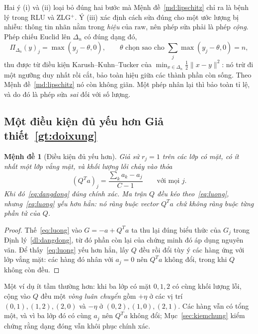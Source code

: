 \documentclass[11pt]{article}
\newtheorem{menhde}[dinhly]{Mệnh đề}
\theoremstyle{remark}
\newcommand{\simplex}{\Delta_n}
\begin{document}
Hai ý (i) và (ii) loại bỏ đúng hai bước mà Mệnh đề~\ref{md:lipschitz} chỉ ra
là bệnh lý trong RLU và ZLG$^+$. Ý (iii) xác định cách sửa đúng cho một ước
lượng bị nhiễu: thông tin nhãn nằm trong \emph{hiệu} của $\mathrm{raw}$, nên
phép sửa phải là phép \emph{cộng}. Phép chiếu Euclid lên $\simplex$ có đúng
dạng đó,
\[
 \Pi_{\simplex}(y)_j = \max(y_j - \theta, 0),
 \qquad \theta \text{ chọn sao cho } \textstyle\sum_j \max(y_j-\theta,0) = n,
\]
thu được từ điều kiện Karush--Kuhn--Tucker của
$\min_{x\in\simplex}\tfrac12\|x-y\|^2$: nó trừ đi một ngưỡng duy nhất rồi
cắt, bảo toàn hiệu giữa các thành phần còn sống. Theo
Mệnh đề~\ref{md:lipschitz} nó còn không giãn. Một phép nhân lại thì bảo toàn
tỉ lệ, và do đó là phép sửa \emph{sai} đối với số lượng.

\subsection{Một điều kiện đủ yếu hơn Giả thiết~\ref{gt:doixung}}

\begin{menhde}[Điều kiện đủ yếu hơn]
\label{md:dieukienyeu}
Giả sử $r_j = 1$ trên các lớp có mặt, có ít nhất một lớp vắng mặt, và khối
lượng lỗi chảy vào thỏa
\begin{equation}
 (Q^Ta)_j = \frac{\sum_k a_k - a_j}{C-1} \qquad \text{với mọi } j .
 \label{eq:luong}
\end{equation}
Khi đó~\eqref{eq:dangdong} đúng chính xác. Ma trận $Q$ đều
kéo theo~\eqref{eq:luong}, nhưng~\eqref{eq:luong} \emph{yếu hơn hẳn}: nó ràng
buộc vector $Q^Ta$ chứ không ràng buộc từng phần tử của $Q$.
\end{menhde}

\begin{proof}
Thế~\eqref{eq:luong} vào $G = -a + Q^Ta$ ta thu lại đúng biểu thức của $G_j$
trong Định lý~\ref{dl:dangdong}, từ đó phần còn lại của chứng minh đó áp dụng
nguyên văn. Để thấy~\eqref{eq:luong} yếu hơn hẳn, lấy $Q$ đều rồi đổi tùy ý
các hàng ứng với lớp vắng mặt: các hàng đó nhân với $a_j = 0$ nên $Q^Ta$ không
đổi, trong khi $Q$ không còn đều.
\end{proof}

Một ví dụ ít tầm thường hơn: khi ba lớp có mặt $0,1,2$ có cùng khối lượng
lỗi, cộng vào $Q$ đều một \emph{vòng luân chuyển} gồm $+\eta$ ở các vị trí
$(0,1),(1,2),(2,0)$ và $-\eta$ ở $(0,2),(1,0),(2,1)$. Các hàng vẫn có tổng
một, và vì ba lớp đó có cùng $a_j$ nên $Q^Ta$ không đổi;
Mục~\ref{sec:kiemchung} kiểm chứng rằng dạng đóng vẫn khôi phục chính xác.
\end{document}

